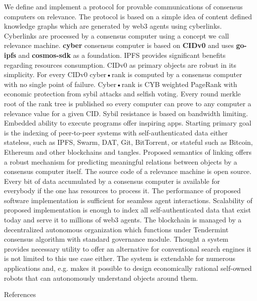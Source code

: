 \documentclass[10pt,oneside]{amsart}
\makeatletter
\def\section{\@startsection{section}{1}%
  \z@{.7\linespacing\@plus\linespacing}{.5\linespacing}%
  {\normalfont\scshape}}%
\newcommand{\code}[1]{\textbf{#1}}
\makeatother
\begin{document}
We define and implement a protocol for provable communications of consensus computers on relevance.
The protocol is based on a simple idea of content defined knowledge graphs which are generated by web3 agents using cyberlinks.
Cyberlinks are processed by a consensus computer using a concept we call relevance machine.
\code{cyber} consensus computer is based on \code{CIDv0} and uses \code{go-ipfs} and \code{cosmos-sdk} as a foundation.
IPFS provides significant benefits regarding resources consumption. CIDv0 as primary objects are robust in its simplicity.
For every CIDv0 cyber•rank is computed by a consensus computer with no single point of failure. Cyber•rank is CYB weighted PageRank with economic protection from sybil attacks and selfish voting. Every round merkle root of the rank tree is published so every computer can prove to any computer a relevance value for a given CID. Sybil resistance is based on bandwidth limiting. Embedded ability to execute programs offer inspiring apps. Starting primary goal is the indexing of peer-to-peer systems with self-authenticated data either stateless, such as IPFS, Swarm, DAT, Git, BitTorrent, or stateful such as Bitcoin, Ethereum and other blockchains and tangles. Proposed semantics of linking offers a robust mechanism for predicting meaningful relations between objects by a consensus computer itself. The source code of a relevance machine is open source. Every bit of data accumulated by a consensus computer is available for everybody if the one has resources to process it. The performance of proposed software implementation is sufficient for seamless agent interactions. Scalability of proposed implementation is enough to index all self-authenticated data that exist today and serve it to millions of web3 agents. The blockchain is managed by a decentralized autonomous organization which functions under Tendermint consensus algorithm with standard governance module. Thought a system provides necessary utility to offer an alternative for conventional search engines it is not limited to this use case either. The system is extendable for numerous applications and, e.g. makes it possible to design economically rational self-owned robots that can autonomously understand objects around them.

\section{References}\label{References}
\end{document}
